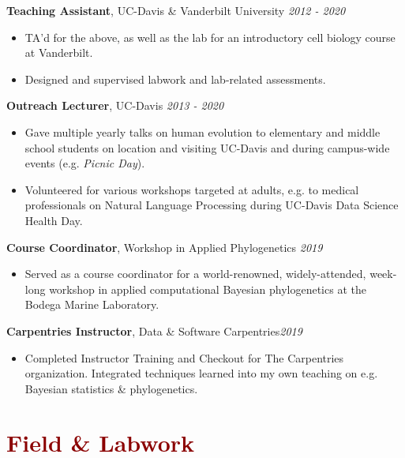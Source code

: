 \documentclass[11pt,margin,line]{resume}
\begin{document}
\begin{resume}
\textbf{Teaching Assistant}, UC-Davis \& Vanderbilt University \hfill \emph{2012  - 2020}
\begin{itemize}[noitemsep]
\item TA'd for the above, as well as the lab for an introductory cell biology course at Vanderbilt. 
\item Designed and supervised labwork and lab-related assessments.
\end{itemize}
\vspace{-1.5mm}

\textbf{Outreach Lecturer}, UC-Davis \hfill \emph{2013  - 2020}\\
\begin{itemize}[noitemsep]
\vspace{-4.5mm} \item Gave multiple yearly talks on human evolution to elementary and middle school students on location and visiting UC-Davis and during campus-wide events (e.g. \emph{Picnic Day}). 
\item Volunteered for various workshops targeted at adults, e.g. to medical professionals on Natural Language Processing during UC-Davis Data Science Health Day.
\end{itemize}
\vspace{-1.5mm}

\textbf{Course Coordinator}, Workshop in Applied Phylogenetics \hfill \emph{2019}
\begin{itemize}[noitemsep]
\item Served as a course coordinator for a world-renowned, widely-attended, week-long workshop in applied computational Bayesian phylogenetics at the Bodega Marine Laboratory.
\end{itemize}
\vspace{-1.5mm}

\textbf{Carpentries Instructor}, Data \& Software Carpentries\hfill \emph{2019}
\begin{itemize}[noitemsep]
\item Completed Instructor Training and Checkout for The Carpentries organization. Integrated techniques learned into my own teaching on e.g. Bayesian statistics \& phylogenetics.\\
\end{itemize}
\vspace{-4.5mm}

\section{\large\textcolor{DarkRed}{Field \& Labwork}}


\end{resume}
\end{document}

